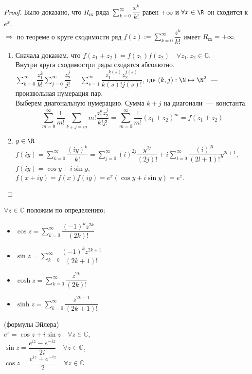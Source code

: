 \begin{proof}
    Было доказано, что $R_{\text{сх}}$ ряда $\sum \limits_{k=0}^\infty \dfrac{x^k}{k!}$ равен $+\infty$ и $\forall x \in \R$ он сходится к $e^x$. \\
    $\Longrightarrow$  по теореме о круге сходимости ряд $ f(z) := \sum \limits_{k=0}^\infty \dfrac{z^k}{k!}$  имеет $R_{\text{сх}} = +\infty$.
    \begin{enumerate}
        \item Сначала докажем, что $f(z_1 + z_2) = f(z_1)f(z_2) \quad \forall z_1, z_2 \in \mathbb{C}$. \\
        Внутри круга сходимостри ряды сходятся абсолютно. \\
        $\sum \limits_{k=0}^{\infty} \dfrac{z_1^k}{k!} \sum \limits_{j =0}^\infty \dfrac{z_2^j}{j!} = \sum \limits_{s=1}^\infty \dfrac{z_1^{k(s)} z_2^{j(s)}}{k(s)! j(s)!}$, где $(k, j) :  \N \mapsto \N^2$~---~ произвольная нумерация пар. \\
        Выберем диагональную нумерацию. Сумма $k + j$ на диагонали~---~константа. \\
        $$ \sum \limits_{m=0}^\infty \dfrac{1}{m!} \sum \limits_{k+j=m} m! \dfrac{z_1^k z_2^j}{k!j!} = \sum \limits_{m=0}^\infty \dfrac{1}{m!} (z_1+z_2)^m = f(z_1 + z_2) $$

        \item $y \in \R$ \\
        $f(iy) = \sum \limits_{k=0}^\infty \dfrac{(iy)^k}{k!} = \sum \limits_{j=0}^\infty (i)^{2j} \dfrac{y^{2j}}{(2j)!} + i \sum \limits_{l=0}^\infty \dfrac{(i)^{2l}}{(2l+1)!} y^{2l+1}$, \\
        $f(iy) = \cos{y} + i \sin{y}$, \\
        $f(x + iy) = f(x) f(iy) = e^x (\cos{y} + i \sin{y}) = e^z$.
    \end{enumerate}
\end{proof}

$\forall z \in \mathbb{C}$ положим по определению: \\
\begin{itemize}
    \item $\cos{z} = \sum \limits_{k=0}^\infty \dfrac{(-1)^k z^{2k}}{(2k)!}$
    \item $\sin{z} = \sum \limits_{k=0}^\infty \dfrac{(-1)^k z^{2k + 1}}{(2k + 1)!}$
    \item $\cosh{z} = \sum \limits_{k=0}^\infty \dfrac{z^{2k}}{(2k)!}$
    \item $\sinh{z} = \sum \limits_{k=0}^\infty \dfrac{z^{2k + 1}}{(2k + 1)!}$
\end{itemize}

\begin{corollary} (формулы Эйлера) \\
$e^z = \cos{z} + i \sin{z} \quad \forall z \in \mathbb{C}$, \\
$\sin{z} = \dfrac{e^{iz} - e^{-iz}}{2i} \quad \forall z \in \mathbb{C}$, \\
$\cos{z} = \dfrac{e^{iz} + e^{-iz}}{2} \quad \forall z \in \mathbb{C}$
\end{corollary}
